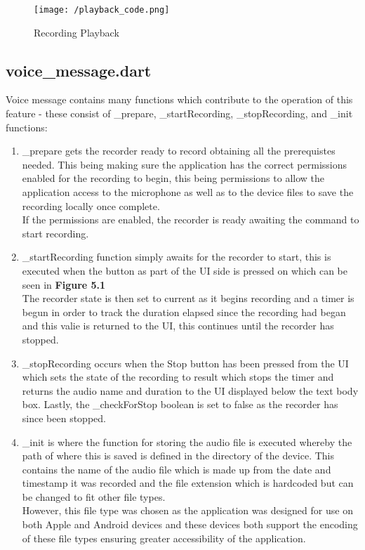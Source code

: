 \documentclass[oneside]{report}
\begin{document}
		\begin{figure}[H]
			\begin{center}
	 		 	\texttt{[image: /playback\_code.png]}
			\end{center}
			\caption[Recording Playback]{Recording Playback}
		\end{figure}


		\subsection{voice\_message.dart}
		Voice message contains many functions which contribute to the operation of this feature - these consist of \_prepare, \_startRecording, \_stopRecording, and \_init functions:

		 \begin{enumerate}
		 	\item \_prepare gets the recorder ready to record obtaining all the prerequistes needed. This being making sure the application has the correct permissions enabled for the recording to begin, this being permissions to allow the application access to the microphone as well as to the device files to save the recording locally once complete.\\

If the permissions are enabled, the recorder is ready awaiting the command to start recording.
			\item \_startRecording function simply awaits for the recorder to start, this is executed when the button as part of the UI side is pressed on which can be seen in \textbf{Figure 5.1}\\

The recorder state is then set to current as it begins recording and a timer is begun in order to track the duration elapsed since the recording had began and this valie is returned to the UI, this continues until the recorder has stopped.
	
		  	\item \_stopRecording occurs when the Stop button has been pressed from the UI which sets the state of the recording to result which stops the timer and returns the audio name and duration to the UI displayed below the text body box. Lastly, the \_checkForStop boolean is set to false as the recorder has since been stopped.\\

			\item \_init is where the function for storing the audio file is executed whereby the path of where this is saved is defined in the directory of the device. This contains the name of the audio file which is made up from the date and timestamp it was recorded and the file extension which is hardcoded but can be changed to fit other file types.\\

However, this file type was chosen as the application was designed for use on both Apple and Android devices and these devices both support the encoding of these file types ensuring greater accessibility of the application.
		 \end{enumerate}
\end{document}
